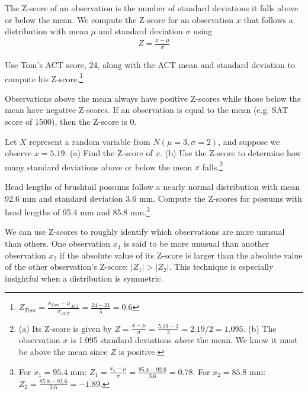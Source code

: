 \begin{termBox}{
The Z-score of an observation is the number of standard deviations it falls above or below the mean. We compute the Z-score for an observation $x$ that follows a distribution with mean $\mu$ and standard deviation $\sigma$ using
\begin{eqnarray*}
Z = \frac{x-\mu}{\sigma}
\end{eqnarray*}}
\end{termBox}

\begin{exercise}
Use Tom's ACT score, 24, along with the ACT mean and standard deviation to compute his Z-score.\footnote{$Z_{Tom} = \frac{x_{Tom} - \mu_{ACT}}{\sigma_{ACT}} = \frac{24 - 21}{5} = 0.6$}
\end{exercise}

Observations above the mean always have positive Z-scores while those below the mean have negative Z-scores. If an observation is equal to the mean (e.g. SAT score of 1500), then the Z-score is $0$.

\begin{exercise}
Let $X$ represent a random variable from $N(\mu=3, \sigma=2)$, and suppose we observe $x=5.19$. (a) Find the Z-score of $x$. (b) Use the Z-score to determine how many standard deviations above or below the mean $x$ falls.\footnote{(a) Its Z-score is given by $Z = \frac{x-\mu}{\sigma} = \frac{5.19 - 3}{2} = 2.19/2 = 1.095$. (b) The observation $x$ is 1.095 standard deviations \emph{above} the mean. We know it must be above the mean since $Z$ is positive.}
\end{exercise}

\begin{exercise} \label{headLZScore}
Head lengths of brushtail possums follow a nearly normal distribution with mean 92.6 mm and standard deviation 3.6 mm. Compute the Z-scores for possums with head lengths of 95.4 mm and 85.8 mm.\footnote{For $x_1=95.4$ mm: $Z_1 = \frac{x_1 - \mu}{\sigma} = \frac{95.4 - 92.6}{3.6} = 0.78$. For $x_2=85.8$ mm: $Z_2 = \frac{85.8 - 92.6}{3.6} = -1.89$.}
\end{exercise}

We can use Z-scores to roughly identify which observations are more unusual than others. One observation $x_1$ is said to be more unusual than another observation $x_2$ if the absolute value of its Z-score is larger than the absolute value of the other observation's Z-score: $|Z_1| > |Z_2|$. This technique is especially insightful when a distribution is symmetric.

